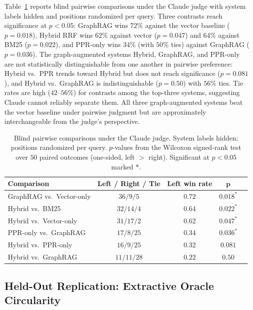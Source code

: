 \documentclass[10pt,a4paper]{article}
\begin{document}
Table~\ref{tab:pairwise} reports blind pairwise comparisons under the
Claude judge with system labels hidden and positions randomized per
query. Three contrasts reach significance at $p < 0.05$: GraphRAG
wins $72\%$ against the vector baseline ($p = 0.018$), Hybrid RRF
wins $62\%$ against vector ($p = 0.047$) and $64\%$ against BM25
($p = 0.022$), and PPR-only wins $34\%$ (with $50\%$ ties) against
GraphRAG ($p = 0.036$). The graph-augmented systems Hybrid, GraphRAG,
and PPR-only are not statistically distinguishable from one another
in pairwise preference: Hybrid vs.\ PPR trends toward Hybrid but does
not reach significance ($p = 0.081$), and Hybrid vs.\ GraphRAG is
indistinguishable ($p = 0.50$) with $56\%$ ties. Tie rates are high
($42$--$56\%$) for contrasts among the top-three systems, suggesting
Claude cannot reliably separate them. All three graph-augmented
systems beat the vector baseline under pairwise judgment but are
approximately interchangeable from the judge's perspective.

\begin{table}[t]
\centering
\small
\caption{Blind pairwise comparisons under the Claude judge. System
labels hidden; positions randomized per query. $p$-values from the
Wilcoxon signed-rank test over $50$ paired outcomes (one-sided, left
$>$ right). Significant at $p < 0.05$ marked $\ast$.}
\label{tab:pairwise}
\begin{tabular}{lcccc}
\toprule
\textbf{Comparison} & \textbf{Left / Right / Tie} & \textbf{Left win rate} & $\boldsymbol{p}$ \\
\midrule
GraphRAG vs.\ Vector-only  & $36 / 9 / 5$  & $\mathbf{0.72}$ & $\mathbf{0.018}^{\ast}$ \\
Hybrid vs.\ BM25           & $32 / 14 / 4$ & $0.64$ & $\mathbf{0.022}^{\ast}$ \\
Hybrid vs.\ Vector-only    & $31 / 17 / 2$ & $0.62$ & $\mathbf{0.047}^{\ast}$ \\
PPR-only vs.\ GraphRAG     & $17 / 8 / 25$ & $0.34$ & $\mathbf{0.036}^{\ast}$ \\
Hybrid vs.\ PPR-only       & $16 / 9 / 25$ & $0.32$ & $0.081$ \\
Hybrid vs.\ GraphRAG       & $11 / 11 / 28$ & $0.22$ & $0.50$ \\
\bottomrule
\end{tabular}
\end{table}


\subsection{Held-Out Replication: Extractive Oracle Circularity}
\label{sec:heldout}
\end{document}
